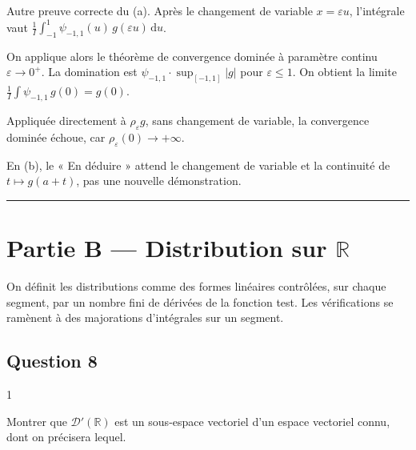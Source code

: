 \documentclass[11pt,a4paper]{article}
\begin{document}
\begin{methode}

Autre preuve correcte du (a). Après le changement de variable \(x=\varepsilon u\), l'intégrale vaut \(\frac1I\int_{-1}^1\psi_{-1,1}(u)\,g(\varepsilon u)\,\mathrm du\).

On applique alors le théorème de convergence dominée à paramètre continu \(\varepsilon\to0^+\). La domination est \(\psi_{-1,1}\cdot\sup_{[-1,1]}|g|\) pour \(\varepsilon\leqslant1\). On obtient la limite \(\frac1I\int\psi_{-1,1}\,g(0)=g(0)\).

Appliquée directement à \(\rho_\varepsilon g\), sans changement de variable, la convergence dominée échoue, car \(\rho_\varepsilon(0)\to+\infty\).

\end{methode}

\begin{piege}

En (b), le « En déduire » attend le changement de variable et la continuité de \(t\mapsto g(a+t)\), pas une nouvelle démonstration.

\end{piege}

\begin{center}\rule{0.5\linewidth}{0.5pt}\end{center}

\hypertarget{partie-b-distribution-sur-mathbb-r}{%
\section{\texorpdfstring{Partie B --- Distribution sur \(\mathbb R\)}{Partie B --- Distribution sur \textbackslash mathbb R}}\label{partie-b-distribution-sur-mathbb-r}}

On définit les distributions comme des formes linéaires contrôlées, sur chaque segment, par un nombre fini de dérivées de la fonction test. Les vérifications se ramènent à des majorations d'intégrales sur un segment.

\hypertarget{question-8}{%
\subsection{Question 8}\label{question-8}}

\begin{indication}{1}

Montrer que \(\mathcal D'(\mathbb R)\) est un sous-espace vectoriel d'un espace vectoriel connu, dont on précisera lequel.

\end{indication}
\end{document}
